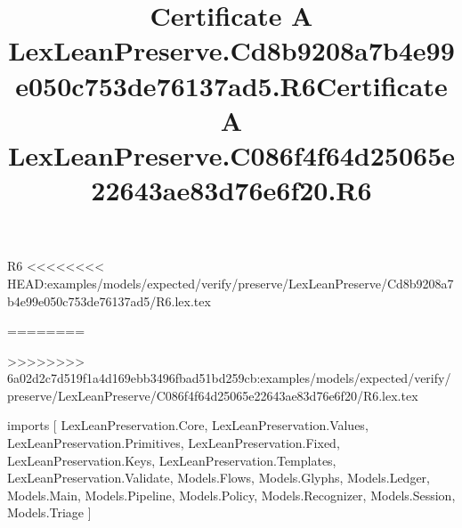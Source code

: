 \begin{lexlean}{R6}
<<<<<<<< HEAD:examples/models/expected/verify/preserve/LexLeanPreserve/Cd8b9208a7b4e99e050c753de76137ad5/R6.lex.tex
\title{Certificate A LexLeanPreserve.Cd8b9208a7b4e99e050c753de76137ad5.R6}
========
\title{Certificate A LexLeanPreserve.C086f4f64d25065e22643ae83d76e6f20.R6}
>>>>>>>> 6a02d2c7d519f1a4d169ebb3496fbad51bd259cb:examples/models/expected/verify/preserve/LexLeanPreserve/C086f4f64d25065e22643ae83d76e6f20/R6.lex.tex
\begin{coremodule}
imports [
  LexLeanPreservation.Core,
  LexLeanPreservation.Values,
  LexLeanPreservation.Primitives,
  LexLeanPreservation.Fixed,
  LexLeanPreservation.Keys,
  LexLeanPreservation.Templates,
  LexLeanPreservation.Validate,
  Models.Flows,
  Models.Glyphs,
  Models.Ledger,
  Models.Main,
  Models.Pipeline,
  Models.Policy,
  Models.Recognizer,
  Models.Session,
  Models.Triage
]


\end{coremodule}
\end{lexlean}
